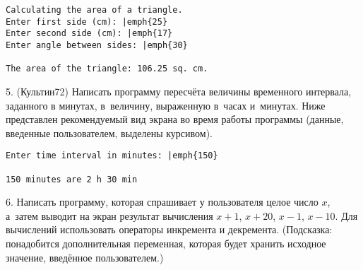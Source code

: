 \documentclass[12pt,russian,draft]{article}
\begin{document}
\begin{Verbatim}[commandchars=\|\{\}]
Calculating the area of a triangle.
Enter first side (cm): |emph{25}
Enter second side (cm): |emph{17}
Enter angle between sides: |emph{30}

The area of the triangle: 106.25 sq. cm.
\end{Verbatim}

5. (Культин72) Написать программу пересчёта величины временного интервала,
задан\-ного в минутах, в~величину, выраженную в~часах и~минутах. Ниже представлен
ре\-ко\-мен\-ду\-емый вид экрана во время работы программы (данные,
введенные пользователем, выделены курсивом).

\begin{Verbatim}[commandchars=\|\{\}]
Enter time interval in minutes: |emph{150}

150 minutes are 2 h 30 min
\end{Verbatim}

6. Написать программу, которая спрашивает у пользователя целое число $x$,
а~затем выводит на экран результат вычисления $x+1$, $x+20$, $x-1$, $x-10$. Для
вычислений использовать операторы инкремента и декремента. (Подсказка:
понадобится дополнительная переменная, которая будет хранить исходное значение,
введённое пользователем.)
\end{document}
